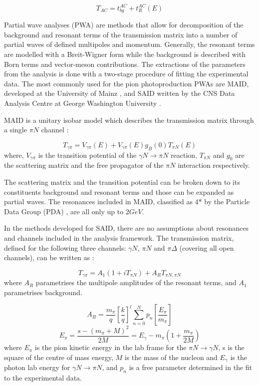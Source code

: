 \begin{equation}
T_{AC}=t_{bg}^{AC}+t_{R}^{AC}(E)
\end{equation}

\indent Partial wave analyses (PWA) are methods that allow for decomposition of the background and resonant terms of the transmission matrix into a number of partial waves of defined multipoles and momentum. Generally, the resonant terms are modelled with a Breit-Wigner form while the background is described with Born terms and vector-meson contributions. The extractions of the parameters from the analysis is done with a two-stage procedure of fitting the experimental data. The most commonly used for the pion photoproduction PWAs are MAID, developed at the University of Mainz \cite{maid}, and SAID written by the CNS Data Analysis Centre at George Washington University \cite{said}.

\indent MAID is a unitary isobar model which describes the transmission matrix through a single $\pi N$ channel \cite {drechsel}:

\begin{equation}
T_{\gamma\pi}=V_{\gamma\pi}(E)+V_{\gamma\pi}(E)g_{B}(0)T_{\pi N}(E)
\end{equation}
where, $V_{\gamma\pi}$ is the transition potential of the $\gamma N\rightarrow \pi N$ reaction, $T_{\pi N}$ and $g_{0}$ are the scattering matrix and the free propagator of the $\pi N$ interaction respectively.

\indent The scattering matrix and the transition potential can be broken down to its constituents background and resonant terms and those can be expanded as partial waves. The resonances included in MAID, classified as 4* by the Particle Data Group (PDA) \cite{pda}, are all only up to $2GeV$.

\indent In the methods developed for SAID, there are no assumptions about resonances and channels included in the analysis framework. The transmission matrix, defined for the following three channels: $\gamma N$, $\pi N$ and $\pi \Delta$ (covering all open channels), can be written as \cite{arndt}:

\begin{equation}
T_{\gamma\pi}=A_{1}(1+iT_{\pi N})+A_{R}T_{\pi N,\pi N}
\end{equation}
where $A_{R}$ parametrises the multipole amplitudes of the resonant terms, and $A_{1}$ parametrises background.

\begin{equation}
A_{R}=\frac{m_{\pi}}{q}[\frac{k}{q}]^{l}\sum_{n=0}^{N}p_{n}[\frac{E_{\pi}}{m_{\pi}}]
\end{equation}
\begin{equation}
E_{\pi}=\frac{s-(m_{\pi}+M)^{2}}{2M}=E_{\gamma}-m_{\pi}(1+\frac{m_{\pi}}{2M})
\end{equation}
where $E_{\pi}$ is the pion kinetic energy in the lab frame for the $\pi N\rightarrow \gamma N$, s is the square of the centre of mass energy, $M$ is the mass of the nucleon and $E_{\gamma}$ is the photon lab energy for $\gamma N \rightarrow \pi N$, and $p_{n}$ is a free parameter determined in the fit to the experimental data.

